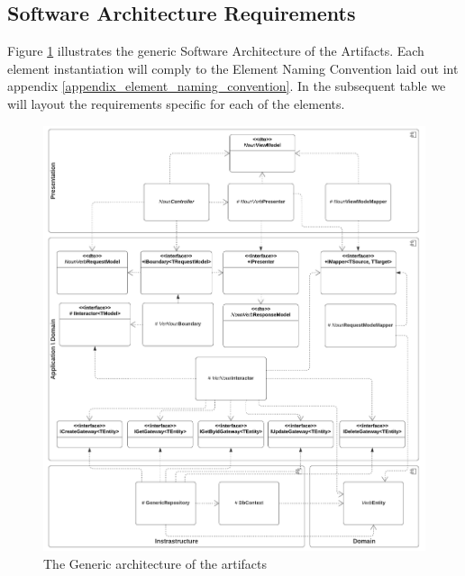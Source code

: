 \subsection{Software Architecture Requirements}

Figure \ref{fig_design} illustrates the generic Software Architecture of the Artifacts.
Each element instantiation will comply to the Element Naming Convention laid out int
appendix \ref{appendix_element_naming_convention}. In the subsequent table we will layout
the requirements specific for each of the elements.

\begin{figure}[H]
    \centering
    \includegraphics[width=1\textwidth]{figures/generic_design.pdf}
    \caption[Generic architecture]{The Generic architecture of the artifacts}
    \label{fig_design}
\end{figure}


